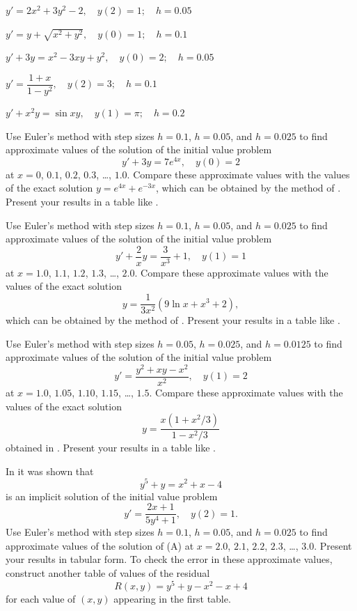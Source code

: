 \begin{exerciselist}
\item\label{exer:3.1.1}\Cex $y'=2x^2+3y^2-2,\quad y(2)=1;\quad h=0.05$
\item\label{exer:3.1.2}\Cex $y'=y+\sqrt{x^2+y^2},\quad y(0)=1;\quad h=0.1$
\item\label{exer:3.1.3}\Cex $y'+3y=x^2-3xy+y^2,\quad y(0)=2;\quad h=0.05$
\item\label{exer:3.1.4}\Cex $y'=\dfrac{1+x}{1-y^2},\quad y(2)=3;\quad h=0.1$
\item\label{exer:3.1.5}\Cex $y'+x^2y=\sin xy,\quad y(1)=\pi;\quad h=0.2$

\item\label{exer:3.1.6}\Cex
Use Euler's method with step sizes $h=0.1$, $h=0.05$, and $h=0.025$ to
find approximate values of the solution of the initial value problem
\[
y'+3y=7e^{4x},\quad y(0)=2
\]
at $x=0$, $0.1$, $0.2$, $0.3$, \dots, $1.0$. Compare these approximate
values with
the values of the exact solution $y=e^{4x}+e^{-3x}$, which can be
obtained by the method of . Present your results
in a table like .


\item\label{exer:3.1.7}\Cex
Use Euler's method with step sizes $h=0.1$, $h=0.05$, and $h=0.025$ to
find approximate values of the solution of the initial value problem
\[
y'+\frac{2}{x}y=\frac{3}{x^3}+1,\quad y(1)=1
\]
at $x=1.0$, $1.1$, $1.2$, $1.3$, \dots, $2.0$. Compare these approximate
values
with the values of the exact solution
\[
y=\frac{1}{3x^2}(9\ln x+x^3+2),
\]
which can be obtained by the method of . Present
your results in a table like .

\item\label{exer:3.1.8}\Cex
Use Euler's method with step sizes $h=0.05$, $h=0.025$, and $h=0.0125$ to
find approximate values of the solution of the initial value problem
\[
y'=\frac{y^2+xy-x^2}{x^2},\quad y(1)=2
\]
at $x=1.0$, $1.05$, $1.10$, $1.15$, \dots, $1.5$. Compare these approximate
values
with the values of the exact solution
\[
y=\frac{x(1+x^2/3)}{1-x^2/3}
\]
obtained in . Present your results in a table
like .


\item\label{exer:3.1.9}\Cex
In  it was shown that
\[
y^5+y=x^2+x-4
\]
is an implicit solution of  the initial value problem
\[
y'=\frac{2x+1}{5y^4+1},\quad y(2)=1.\tag{A}
\]
Use Euler's method with step sizes $h=0.1$, $h=0.05$, and $h=0.025$ to
find approximate values of the solution of (A) at
$x=2.0$, $2.1$, $2.2$, $2.3$, \dots, $3.0$. Present your results in tabular
form.
To
check the error in these approximate values, construct another table
of values of the residual
\[
  R(x,y)=y^5+y-x^2-x+4
\]
for each value of $(x,y)$ appearing in the first table.



\end{exerciselist}
